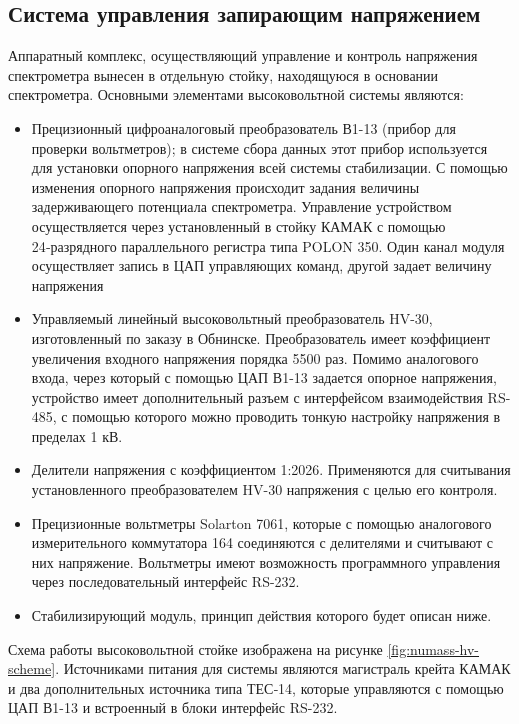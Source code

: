 \documentclass[a4paper,14pt]{extreport}
\begin{document}
\subsection{Система управления запирающим напряжением}
Аппаратный комплекс, осуществляющий управление и контроль напряжения спектрометра вынесен в отдельную стойку, находящуюся в основании спектрометра. Основными элементами высоковольтной системы являются:
\begin{itemize}
    \item Прецизионный цифроаналоговый преобразователь В1-13 (прибор для проверки вольтметров); в системе сбора данных этот прибор используется для установки опорного напряжения всей системы стабилизации. С помощью изменения опорного напряжения происходит задания величины задерживающего потенциала спектрометра. Управление устройством осуществляется через установленный в стойку КАМАК с помощью 24‑разрядного параллельного регистра типа POLON 350. Один канал модуля осуществляет запись в ЦАП управляющих команд, другой задает величину напряжения
    \item Управляемый линейный высоковольтный преобразователь HV-30, изготовленный по заказу в Обнинске. Преобразователь имеет коэффициент увеличения входного напряжения порядка 5500 раз. Помимо аналогового входа, через который с помощью ЦАП В1-13 задается опорное напряжения, устройство имеет дополнительный разъем с интерфейсом взаимодействия RS-485, с помощью которого можно проводить тонкую настройку напряжения в пределах 1 кВ.
    \item Делители напряжения с коэффициентом 1:2026. Применяются для считывания установленного преобразователем HV-30 напряжения с целью его контроля.
    \item Прецизионные вольтметры Solarton 7061, которые с помощью аналогового измерительного коммутатора 164 соединяются с делителями и считывают с них напряжение. Вольтметры имеют возможность программного управления через последовательный интерфейс RS-232.
    \item Стабилизирующий модуль, принцип действия которого будет описан ниже.
\end{itemize}

Схема работы высоковольтной стойке изображена на рисунке \ref{fig:numass-hv-scheme}. Источниками питания для системы являются магистраль крейта КАМАК и два дополнительных источника типа ТЕС‑14, которые управляются с помощью ЦАП В1-13 и встроенный в блоки интерфейс RS-232.
\end{document}
